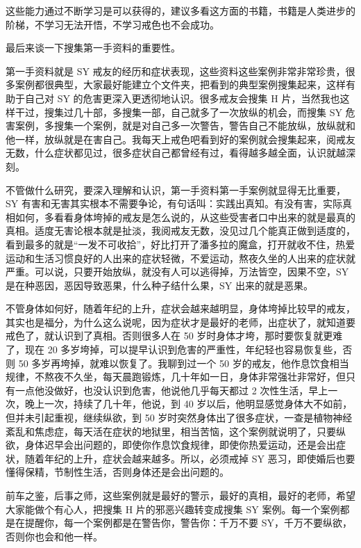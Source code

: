 \documentclass{ctexart}
\begin{document}
这些能力通过不断学习是可以获得的，建议多看这方面的书籍，书籍是人类进步的阶梯，不学习无法开悟，不学习戒色也不会成功。

最后来谈一下搜集第一手资料的重要性。

第一手资料就是 SY 戒友的经历和症状表现，这些资料这些案例非常非常珍贵，很多案例都很典型，大家最好能建立个文件夹，把看到的典型案例搜集起来，这样有助于自己对 SY 的危害更深入更透彻地认识。很多戒友会搜集 H 片，当然我也这样干过，搜集过几十部，多搜集一部，自己就多了一次放纵的机会，而搜集 SY 危害案例，多搜集一个案例，就是对自己多一次警告，警告自己不能放纵，放纵就和他一样，放纵就是在害自己。我每天上戒色吧看到好的案例就会搜集起来，阅戒友无数，什么症状都见过，很多症状自己都曾经有过，看得越多越全面，认识就越深刻。

不管做什么研究，要深入理解和认识，第一手资料第一手案例就显得无比重要，SY 有害和无害其实根本不需要争论，有句话叫：实践出真知。有没有害，实际真相如何，多看看身体垮掉的戒友是怎么说的，从这些受害者口中出来的就是最真的真相。适度无害论根本就是扯淡，我阅戒友无数，没见过几个能真正做到适度的，看到最多的就是“一发不可收拾”，好比打开了潘多拉的魔盒，打开就收不住，热爱运动和生活习惯良好的人出来的症状轻微，不爱运动，熬夜久坐的人出来的症状就严重。可以说，只要开始放纵，就没有人可以逃得掉，万法皆空，因果不空，SY 是在种恶因，恶因导致恶果，什么种子结什么果，SY 出来的就是恶果。

不管身体如何好，随着年纪的上升，症状会越来越明显，身体垮掉比较早的戒友，其实也是福分，为什么这么说呢，因为症状才是最好的老师，出症状了，就知道要戒色了，就认识到了真相。否则很多人在 50 岁时身体才垮，那时要恢复就更难了，现在 20 多岁垮掉，可以提早认识到危害的严重性，年纪轻也容易恢复些，否则 50 多岁再垮掉，就难以恢复了。我聊到过一个 50 岁的戒友，他作息饮食相当规律，不熬夜不久坐，每天晨跑锻炼，几十年如一日，身体非常强壮非常好，但只有一点他没做好，也没认识到危害，他说他几乎每天都过 2 次性生活，早上一次，晚上一次，持续了几十年，他说，到 40 岁以后，他明显感觉身体大不如前，但并未引起重视，继续纵欲，到 50 岁时突然身体出了很多症状，一查是植物神经紊乱和焦虑症，每天活在症状的地狱里，相当苦恼，这个案例就说明了，只要纵欲，身体迟早会出问题的，即使你作息饮食规律，即使你热爱运动，还是会出症状，随着年纪的上升，症状会越来越多。所以，必须戒掉 SY 恶习，即使婚后也要懂得保精，节制性生活，否则身体还是会出问题的。

前车之鉴，后事之师，这些案例就是最好的警示，最好的真相，最好的老师，希望大家能做个有心人，把搜集 H 片的邪恶兴趣转变成搜集 SY 案例。每一个案例都是在提醒你，每一个案例都是在警告你，警告你：千万不要 SY，千万不要纵欲，否则你也会和他一样。
\end{document}
